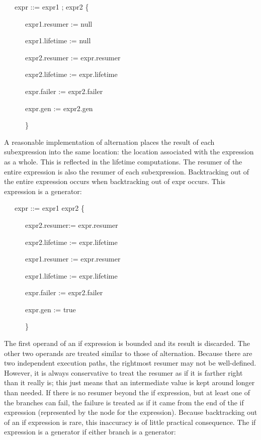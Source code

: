 {\ttfamily\mdseries
\ \ \ expr ::= expr1 ; expr2 \{}

{\ttfamily\mdseries
\ \ \ \ \ \ expr1.resumer := null}

{\ttfamily\mdseries
\ \ \ \ \ \ expr1.lifetime := null}

{\ttfamily\mdseries
\ \ \ \ \ \ expr2.resumer := expr.resumer}

{\ttfamily\mdseries
\ \ \ \ \ \ expr2.lifetime := expr.lifetime}

{\ttfamily\mdseries
\ \ \ \ \ \ expr.failer := expr2.failer}

{\ttfamily\mdseries
\ \ \ \ \ \ expr.gen := expr2.gen}

{\ttfamily\mdseries
\ \ \ \ \ \ \}}


A reasonable implementation of alternation places the result of each
subexpression into the same location: the location associated with the
expression as a whole. This is reflected in the lifetime
computations. The resumer of the entire expression is also the resumer
of each subexpression. Backtracking out of the entire expression
occurs when backtracking out of expr occurs. This
expression is a generator:

{\ttfamily\mdseries
\ \ \ expr ::= expr1 {\textbar} expr2 \{}

{\ttfamily\mdseries
\ \ \ \ \ \ expr2.resumer:= expr.resumer}

{\ttfamily\mdseries
\ \ \ \ \ \ expr2.lifetime := expr.lifetime}

{\ttfamily\mdseries
\ \ \ \ \ \ expr1.resumer := expr.resumer}

{\ttfamily\mdseries
\ \ \ \ \ \ expr1.lifetime := expr.lifetime}

{\ttfamily\mdseries
\ \ \ \ \ \ expr.failer := expr2.failer}

{\ttfamily\mdseries
\ \ \ \ \ \ expr.gen := true}

{\ttfamily\mdseries
\ \ \ \ \ \ \}}


The first operand of an if expression is bounded and its result is
discarded. The other two operands are treated similar to those of
alternation. Because there are two independent execution paths, the
rightmost resumer may not be well-defined. However, it is always
conservative to treat the resumer as if it is farther right than it
really is; this just means that an intermediate value is kept around
longer than needed. If there is no resumer beyond the if expression,
but at least one of the branches can fail, the failure is treated as
if it came from the end of the if expression (represented by the node
for the expression). Because backtracking out of an if expression is
rare, this inaccuracy is of little practical consequence. The if
expression is a generator if either branch is a generator:

